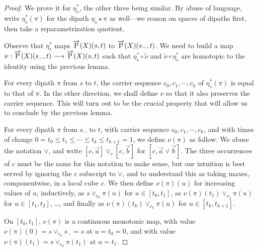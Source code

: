 \begin{proof}
  We prove it for $\eta_s^*$, the other three being similar. By abuse of language, write $\eta_s^* (\pi)$ for the dipath $\eta_s
  \star \pi$ as well---we reason on spaces of dipaths first, then take
  a reparametrization quotient.  

  Observe that $\eta_s^*$ maps $\overrightarrow{\text{P}}(X)(s,t)$ to $\overrightarrow{\text{P}}(X)(s_-,t)$.  We
  need to build a map $\nu : \overrightarrow{\text{P}}(X)(s_-,t) \longrightarrow \overrightarrow{\text{P}}(X)(s,t)$ such that
  $\eta_s^* \circ \tilde{\nu}$ and $\tilde{\nu} \circ \eta_s^*$ are homotopic to the
  identity using the previous lemma.

  For every dipath $\pi$ from $s$ to $t$, the carrier sequence $c_0,
  c_1, \cdots,c_k$ of $\eta_s^* (\pi)$ is equal to that of $\pi$.
  In the other direction, we shall define $\nu$ so that it also
  preserves the carrier sequence.  This will turn out to be the
  crucial property that will allow us to conclude by the previous lemma.

  For every dipath $\pi$ from $s_-$ to $t$, with carrier sequence
  $c_0, c_1, \cdots, c_k$, and with times of change $0=t_0\leq
  t_1\leq\cdots\leq t_k \leq t_{k+1}=1$, we define $\nu (\pi)$ as follow.  We
  abuse the notation $\vee$, and write $[c, \vec a] \vee_c [c, \vec
  b]$ for $[c, \vec a \vee \vec b]$.  The three occurrences of $c$
  must be the same for this notation to make sense, but our intuition
  is best served by ignoring the $c$ subscript to $\vee$, and to
  understand this as taking maxes, componentwise, in a local cube $c$.
  We then define $\nu (\pi) (u)$ for increasing values of $u$,
  inductively, as $s \vee_{c_0} \pi (u)$ for $u \in [t_0, t_1]$, as
  $\nu (\pi) (t_1) \vee_{c_1} \pi (u)$ for $u \in [t_1, t_2]$, \ldots,
  and finally as $\nu (\pi) (t_k) \vee_{c_k} \pi (u)$ for $u \in [t_k, t_{k+1}]$.

  On $[t_0, t_1]$, $\nu (\pi)$ is a continuous monotonic map, with
  value $\nu (\pi) (0) = s \vee_{c_0} s_- = s$ at $u=t_0=0$, and with
  value $\nu (\pi) (t_1) = s \vee_{c_0} \pi (t_1)$ at $u=t_1$.
  

\end{proof}
